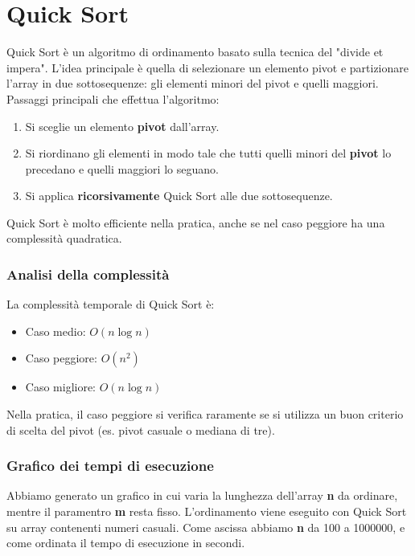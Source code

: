 \documentclass[a4paper, 12pt, oneside]{book}
\begin{document}
\chapter*{Quick Sort}

Quick Sort è un algoritmo di ordinamento basato sulla tecnica del "divide et impera". L'idea principale è quella di selezionare un elemento pivot e partizionare l'array in due sottosequenze: gli elementi minori del pivot e quelli maggiori. Passaggi principali che effettua l'algoritmo:

\begin{enumerate}
	\item Si sceglie un elemento \textbf{pivot} dall'array.
	\item Si riordinano gli elementi in modo tale che tutti quelli minori del \textbf{pivot} lo precedano e quelli maggiori lo seguano.
	\item Si applica \textbf{ricorsivamente} Quick Sort alle due sottosequenze.
\end{enumerate}

\noindent Quick Sort è molto efficiente nella pratica, anche se nel caso peggiore ha una complessità quadratica.

\subsection*{Analisi della complessità}

La complessità temporale di Quick Sort è:
\begin{itemize}
	\item Caso medio: \(O(n \log n)\) 
	\item Caso peggiore: \(O(n^2)\)
	\item Caso migliore: \(O(n \log n)\)
\end{itemize}

\noindent Nella pratica, il caso peggiore si verifica raramente se si utilizza un buon criterio di scelta del pivot (es. pivot casuale o mediana di tre).

\subsection*{Grafico dei tempi di esecuzione}

Abbiamo generato un grafico in cui varia la lunghezza dell'array \textbf{n} da ordinare, mentre il paramentro \textbf{m} resta fisso. L'ordinamento viene eseguito con Quick Sort su array contenenti numeri casuali. Come ascissa abbiamo \textbf{n} da 100 a 1000000, e come ordinata il tempo di esecuzione in secondi.
\end{document}
